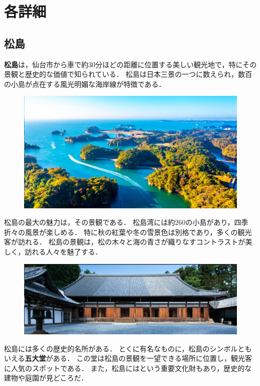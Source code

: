 \section{各詳細}
\subsection*{松島}
\footnotesize

\textbf{松島}は，仙台市から車で約30分ほどの距離に位置する美しい観光地で，特にその景観と歴史的な価値で知られている．
松島は日本三景の一つに数えられ，数百の小島が点在する風光明媚な海岸線が特徴である．

\begin{figure}[H]
	\centering
	\includegraphics[width=0.7\linewidth]{img/matsushima-islets}
	\label{fig:matsushima-islets}
\end{figure}

松島の最大の魅力は，その景観である．
松島湾には約260の小島があり，四季折々の風景が楽しめる．
特に秋の紅葉や冬の雪景色は別格であり，多くの観光客が訪れる．
松島の景観は，松の木々と海の青さが織りなすコントラストが美しく，訪れる人々を魅了する．

\begin{figure}[H]
	\centering
	\includegraphics[width=0.8\linewidth]{img/zuiganji}
	\label{fig:zuiganji}
\end{figure}

松島には多くの歴史的名所がある．
とくに有名なものに，松島のシンボルともいえる\textbf{五大堂}がある．
この堂は松島の景観を一望できる場所に位置し，観光客に人気のスポットである．
また，松島には\textbf{}という重要文化財もあり，歴史的な建物や庭園が見どころだ．
\newpage

